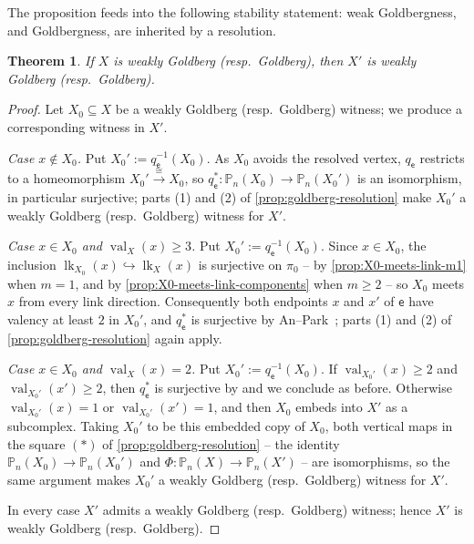 \documentclass[reqno]{amsart}
\newtheorem{theorem}{Theorem}[section]
\theoremstyle{definition}
\newcommand\sfe{\mathsf{e}}
\newcommand{\PB}{\mathbb{P}}
\DeclareMathOperator{\lk}{lk}
\DeclareMathOperator{\val}{val}
\numberwithin{equation}{section}
\begin{document}
The proposition feeds into the following stability statement: weak
Goldbergness, and Goldbergness, are inherited by a resolution.

\begin{theorem}\label{thm:resolution-preserves-goldberg}
If \(X\) is weakly Goldberg \textup{(}resp.\ Goldberg\textup{)}, then
\(X'\) is weakly Goldberg \textup{(}resp.\ Goldberg\textup{)}.
\end{theorem}

\begin{proof}
Let \(X_0\subseteq X\) be a weakly Goldberg (resp.\ Goldberg) witness;
we produce a corresponding witness in \(X'\).

\emph{Case \(x\notin X_0\).} Put \(X_0':=q_\sfe^{-1}(X_0)\). As \(X_0\)
avoids the resolved vertex, \(q_\sfe\) restricts to a homeomorphism
\(X_0'\xrightarrow{\cong}X_0\), so
\(q_\sfe^\ast\colon\PB_n(X_0)\to\PB_n(X_0')\) is an isomorphism, in
particular surjective; parts (1) and (2) of
\cref{prop:goldberg-resolution} make \(X_0'\) a weakly Goldberg
(resp.\ Goldberg) witness for \(X'\).

\emph{Case \(x\in X_0\) and \(\val_X(x)\geq 3\).} Put
\(X_0':=q_\sfe^{-1}(X_0)\). Since \(x\in X_0\), the inclusion
\(\lk_{X_0}(x)\hookrightarrow\lk_X(x)\) is surjective on \(\pi_0\) --
by \cref{prop:X0-meets-link-m1} when \(m=1\), and by
\cref{prop:X0-meets-link-components} when \(m\geq 2\) -- so \(X_0\)
meets \(x\) from every link direction. Consequently both endpoints
\(x\) and \(x'\) of \(\sfe\) have valency at least \(2\) in \(X_0'\), and
\(q_\sfe^\ast\) is surjective by An--Park~\cite[Prop.~3.1]{AnPark2017};
parts (1) and (2) of \cref{prop:goldberg-resolution} again apply.

\emph{Case \(x\in X_0\) and \(\val_X(x)=2\).} Put
\(X_0':=q_\sfe^{-1}(X_0)\). If \(\val_{X_0'}(x)\geq 2\) and
\(\val_{X_0'}(x')\geq 2\), then \(q_\sfe^\ast\) is surjective by
\cite[Prop.~3.1]{AnPark2017} and we conclude as before. Otherwise
\(\val_{X_0'}(x)=1\) or \(\val_{X_0'}(x')=1\), and then \(X_0\) embeds
into \(X'\) as a subcomplex. Taking \(X_0'\) to be this embedded copy
of \(X_0\), both vertical maps in the square \((\ast)\) of
\cref{prop:goldberg-resolution} -- the identity
\(\PB_n(X_0)\to\PB_n(X_0')\) and \(\Phi\colon\PB_n(X)\to\PB_n(X')\) --
are isomorphisms, so the same argument makes \(X_0'\) a weakly
Goldberg (resp.\ Goldberg) witness for \(X'\).

In every case \(X'\) admits a weakly Goldberg (resp.\ Goldberg)
witness; hence \(X'\) is weakly Goldberg (resp.\ Goldberg).
\end{proof}
\end{document}
